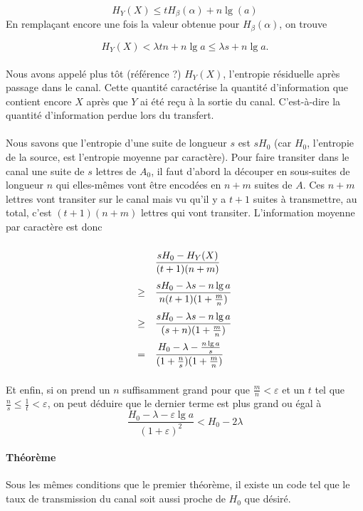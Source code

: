 	\[H_Y(X)\le t H_\beta(\alpha) + n \lg(a)\]
	En remplaçant encore une fois la valeur obtenue pour $H_\beta(\alpha)$, 
	on trouve
	
	\[H_Y(X)<\lambda t n + n \lg a \le \lambda s+n \lg a.\]
	
	\paragraph{}
	Nous avons appelé plus tôt (référence ?) $H_Y(X)$, l'entropie résiduelle 
	après passage dans le canal. Cette quantité caractérise la quantité 
	d'information que contient encore $X$ après que $Y$ ai été reçu à la 
	sortie du canal. C'est-à-dire la quantité d'information perdue lors 
	du transfert.
	
	\paragraph{}
	Nous savons que l'entropie d'une suite de longueur $s$ est $sH_0$ 
	(car $H_0$, l'entropie de la source, est l'entropie moyenne par caractère). 
	Pour faire transiter dans le canal une suite de $s$ lettres de $A_0$,
	il faut d'abord la découper en sous-suites de longueur $n$ qui 
	elles-mêmes vont être encodées en $n+m$ suites de $A$. Ces $n+m$ lettres
	vont transiter sur le canal mais vu qu'il y a $t+1$ suites à 
	transmettre, au total, c'est $(t+1)(n+m)$ lettres qui vont transiter. 
	L'information moyenne par caractère est donc
	
	\[
		\def\arraystretch{2.5}
		\begin{array}{c>{\displaystyle}l}
		&\frac{sH_0-H_Y(X)}{(t+1)(n+m)}\\
		\ge&\frac{sH_0-\lambda s-n\lg a}{n(t+1)(1+\frac{m}{n})}\\
		\ge&\frac{sH_0-\lambda s-n\lg a}{(s+n)(1+\frac{m}{n})}\\
		=&\frac{H_0-\lambda-\frac{n\lg a}{s}}{(1+\frac{n}{s})(1+\frac{m}{n})}\\
		\end{array}
	\]
	
	\paragraph{}
	Et enfin, si on prend un $n$ suffisamment grand pour que 
	$\frac{m}{n}<\varepsilon$ et un $t$ tel que
	$\frac{n}{s} \le \frac{1}{t} < \varepsilon$, on peut 
	déduire que le dernier terme est plus grand ou égal à
	\[\frac{H_0-\lambda-\varepsilon\lg a}{(1+\varepsilon)^2}<H_0-2\lambda\]
	
	
	
	
	
	
	
	
	\paragraph{Théorème}
	Sous les mêmes conditions que le premier théorème, il existe un code tel
	que le taux de transmission du canal soit aussi proche de $H_0$ que désiré.

